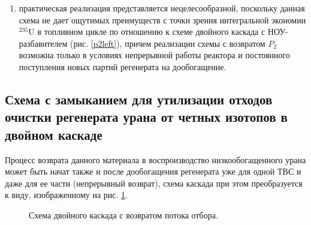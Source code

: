 \begin{enumerate}
    \item практическая реализация представляется нецелесообразной, поскольку данная схема не дает ощутимых преимуществ с точки зрения интегральной экономии $^{235}$U в топливном цикле по отношению к схеме двойного каскада с НОУ-разбавителем (рис. \ref{p2left}), причем реализации схемы с возвратом $P_2$ возможна только в условиях непрерывной работы реактора и постоянного поступления новых партий регенерата на дообогащение.
\end{enumerate}


\subsection{Схема с замыканием для утилизации отходов очистки регенерата урана от четных изотопов в двойном каскаде}

Процесс возврата данного материала в воспроизводство низкообогащенного урана может быть начат также и после дообогащения регенерата уже для одной ТВС и даже для ее части (непрерывный возврат), схема каскада при этом преобразуется к виду, изображенному на рис. \ref{net}. 

\begin{figure}[ht]
    \caption{Схема двойного каскада с возвратом потока отбора.}\label{net}
\end{figure}


